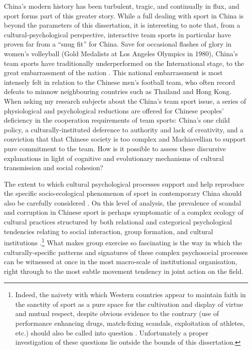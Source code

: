 {%
China's modern history has been turbulent, tragic, and continually in flux, and sport forms part of this greater story.  While a full dealing with sport in China is beyond the parameters of this dissertation, it is interesting to note that, from a cultural-psychological perspective, interactive team sports in particular have proven far from a ``snug fit'' for China.  Save for occasional flashes of glory in women's volleyball (Gold Medalists at Los Angeles Olympics in 1980), China's team sports have traditionally underperformed on the International stage, to the great embarrassment of the nation \citep{Brownell2008}.  This national embarrassment is most intensely felt in relation to the Chinese men's football team, who often record defeats to minnow neighbouring countries such as Thailand and Hong Kong. When asking my research subjects about the China's team sport issue, a series of physiological and psychological reductions are offered for Chinese peoples' deficiency in the cooperation requirements of team sports: China's one child policy, a culturally-instituted deference to authority and lack of creativity, and a conviction that that Chinese society is too complex and Machiavellian to support pure commitment to the team.  How is it possible to assess these discursive explanations in light of cognitive and evolutionary mechanisms of cultural transmission and social cohesion?

The extent to which cultural psychological processes support and help reproduce the specific socio-ecological phenomenon of sport in contemporary China should also be carefully considered \citep{Sperber1996,Nisbett2003}.  On this level of analysis, the prevalence of scandal and corruption in Chinese sport is perhaps symptomatic of a complex ecology of cultural practices structured by both relational and categorical psychological tendencies relating to social interaction, group formation, and cultural institutions \citep{Nisbett2003,Yuki2005,Liu2009}.\footnote{Indeed, the naivety with which Western countries appear to maintain faith in the sanctity of sport as a pure space for the cultivation and display of virtue and mutual respect, despite obvious evidence to the contrary (use of performance enhancing drugs, match-fixing scandals, exploitation of athletes, etc.) should also be called into question \citep{Southall2017}.  Unfortunately a proper investigation of these questions lie outside the bounds of this dissertation.} What makes group exercise so fascinating is the way in which the culturally-specific patterns and signatures of these complex psychosocial processes can be witnessed at once in the most macro-scale of institutional organisation, right through to the most subtle movement tendency in joint action on the field.


}
